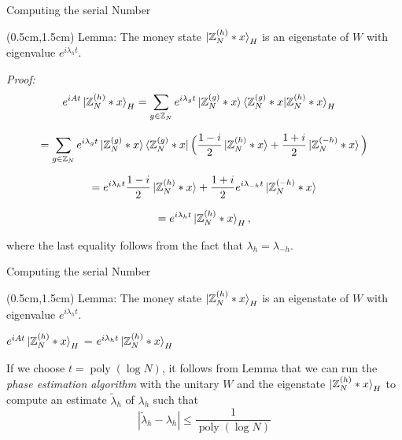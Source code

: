 \documentclass{beamer}
\theoremstyle{definition}
\begin{document}
\begin{frame}{Computing the serial Number}

    \begin{textblock*}{12cm}(0.5cm,1.5cm)
        Lemma: The money state $\ket{\mathbb{Z}_N^{(h)} * x}_H$ is an eigenstate of $W$ with eigenvalue $e^{i\lambda_h t}$.
        

        \textit{Proof:}
        \begin{align*}
            e^{iAt} \ket{\mathbb{Z}_N^{(h)} * x}_H
            & = \sum_{g \in \mathbb{Z}_N} e^{i\lambda_gt} \ket{\mathbb{Z}_N^{(g)} * x}\braket{\mathbb{Z}_N^{(g)} * x|\mathbb{Z}_N^{(h)} * x}_H 
        \end{align*}


        \[
        =\sum_{g \in \mathbb{Z}_N} e^{i\lambda_gt} \ket{\mathbb{Z}_N^{(g)} * x} \bra{\mathbb{Z}_N^{(g)} * x} \Big( \frac{1 - i}{2} \ket{\mathbb{Z}_N^{(h)} * x} + \frac{1 + i}{2} \ket{\mathbb{Z}_N^{(-h)} * x} \Big) 
        \]

        \[
        =e^{i\lambda_{h}t} \frac{1 - i}{2} \ket{\mathbb{Z}_N^{(h)} * x} + \frac{1 + i}{2} e^{i\lambda_{-h}t} \ket{\mathbb{Z}_N^{(-h)} * x} 
        \]


        \[
        =e^{i\lambda_{h}t} \ket{\mathbb{Z}_N^{(h)} * x}_H,
        \]


        where the last equality follows from the fact that $\lambda_h = \lambda_{-h}$.
    \end{textblock*}

 \end{frame}



 
\begin{frame}{Computing the serial Number}

    \begin{textblock*}{12cm}(0.5cm,1.5cm)
        Lemma: The money state $\ket{\mathbb{Z}_N^{(h)} * x}_H$ is an eigenstate of $W$ with eigenvalue $e^{i\lambda_h t}$.
        \vspace{1cm}

        $e^{iAt} \ket{\mathbb{Z}_N^{(h)} * x}_H$ = $e^{i\lambda_{h}t} \ket{\mathbb{Z}_N^{(h)} * x}_H$
        
        \vspace{1cm}
        If we choose $t = \operatorname{poly}(\log N)$, it follows from Lemma that we can run the \textit{phase estimation algorithm} with the unitary $W$ and the eigenstate $\ket{\mathbb{Z}_N^{(h)} * x}_H$ to compute an estimate $\tilde{\lambda}_h$ of $\lambda_h$ such that %
        \[
        |\tilde{\lambda}_h - \lambda_h| \leq \frac{1}{\operatorname{poly}(\log N)}
        \]
        

        
    \end{textblock*}

 \end{frame}
\end{document}
